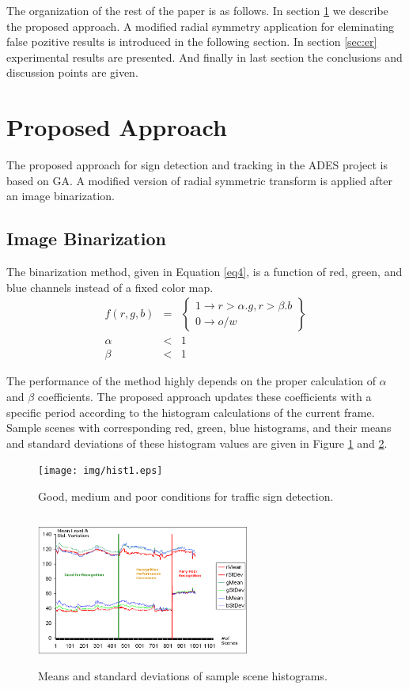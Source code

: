 \documentclass[twocolumn,letterpaper,10pt]{article}
\begin{document}
The organization of the rest of the paper is as follows. In section \ref{sec:pa} we describe the proposed approach. A modified radial symmetry application for eleminating false pozitive results is introduced in the following section. In section \ref{sec:er} experimental results are presented. And finally in last section the conclusions and discussion points are given.

\section{Proposed Approach}
\label{sec:pa}
The proposed approach for sign detection and tracking in the ADES project is based on GA. A modified version of radial symmetric transform is applied after an image binarization. 
\subsection{Image Binarization}
The binarization method, given in Equation \ref{eq4}, is a function of red, green, and blue channels instead of a fixed color map.
\begin{eqnarray}
\label{eq4}
\nonumber f(r,g,b)&=& \left\{\begin{array}{l} 1 \rightarrow r>\alpha.g, r>\beta.b \\ 0 \rightarrow o/w \end{array}\right\}\\
\alpha &<& 1 \\
\nonumber \beta &<& 1
\end{eqnarray}
\par
\noindent The performance of the method highly depends on the proper calculation of $\alpha$ and $\beta$ coefficients. The proposed approach updates these coefficients with a specific period according to the histogram calculations of the current frame. Sample scenes with corresponding red, green, blue histograms, and their means and standard deviations of these histogram values are given in Figure \ref{fig:hist1} and  \ref{fig:hist2}.
\begin{figure}[ht]
\begin{center}
\texttt{[image: img/hist1.eps]}
\caption{Good, medium and poor conditions for traffic sign detection.}
\label{fig:hist1}
\end{center}
\end{figure}
\par
\begin{figure}[ht]
\begin{center}
\includegraphics[width=70mm,height=50mm]{img/hist2.eps}
\caption{Means and standard deviations of sample scene histograms.}
\label{fig:hist2}
\end{center}
\end{figure}
\end{document}
